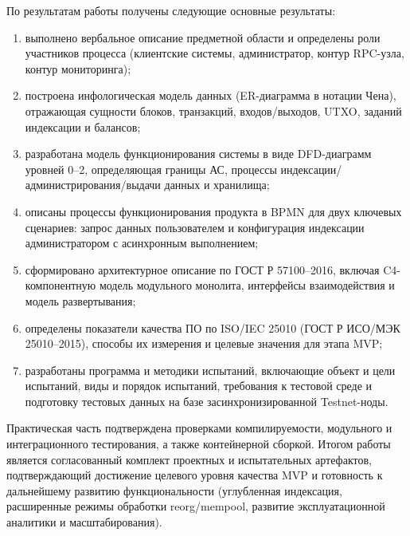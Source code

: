 ﻿\documentclass[14pt,a4paper]{extarticle}
\begin{document}
\noindent По результатам работы получены следующие основные результаты:
\begin{enumerate}
  \item выполнено вербальное описание предметной области и определены роли участников процесса (клиентские системы, администратор, контур RPC-узла, контур мониторинга);
  \item построена инфологическая модель данных (ER-диаграмма в нотации Чена), отражающая сущности блоков, транзакций, входов/выходов, UTXO, заданий индексации и балансов;
  \item разработана модель функционирования системы в виде DFD-диаграмм уровней 0--2, определяющая границы АС, процессы индексации/администрирования/выдачи данных и хранилища;
  \item описаны процессы функционирования продукта в BPMN для двух ключевых сценариев: запрос данных пользователем и конфигурация индексации администратором с асинхронным выполнением;
  \item сформировано архитектурное описание по ГОСТ Р 57100--2016, включая C4-компонентную модель модульного монолита, интерфейсы взаимодействия и модель развертывания;
  \item определены показатели качества ПО по ISO/IEC 25010 (ГОСТ Р ИСО/МЭК 25010--2015), способы их измерения и целевые значения для этапа MVP;
  \item разработаны программа и методики испытаний, включающие объект и цели испытаний, виды и порядок испытаний, требования к тестовой среде и подготовку тестовых данных на базе засинхронизированной Testnet-ноды.
\end{enumerate}

\noindent Практическая часть подтверждена проверками компилируемости, модульного и интеграционного тестирования, а также контейнерной сборкой. Итогом работы является согласованный комплект проектных и испытательных артефактов, подтверждающий достижение целевого уровня качества MVP и готовность к дальнейшему развитию функциональности (углубленная индексация, расширенные режимы обработки reorg/mempool, развитие эксплуатационной аналитики и масштабирования).

\newpage
\end{document}
